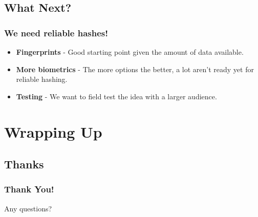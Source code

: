 \documentclass{beamer}
\begin{document}
    \subsection{What Next?}
      \begin{frame}
        \frametitle{We need reliable hashes!}
        \begin{itemize}
          \item \textbf{Fingerprints} - Good starting point given the amount of
                data available.
          \item \textbf{More biometrics} - The more options the better, a lot
                aren't ready yet for reliable hashing.
          \item \textbf{Testing} - We want to field test the idea with a larger
                audience.
        \end{itemize}
      \end{frame}
  \section{Wrapping Up}
    \subsection{Thanks}
      \begin{frame}
        \frametitle{Thank You!}
        \Huge{Any questions?}
      \end{frame}
\end{document}
